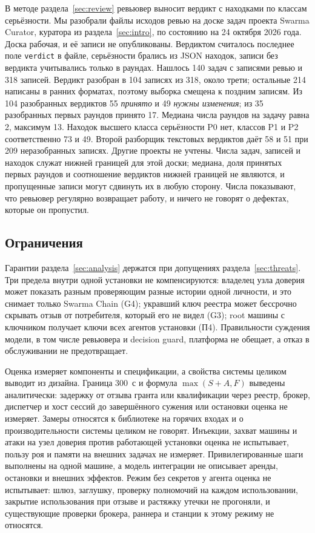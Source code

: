\documentclass[10pt,a4paper]{article}
\begin{document}
В методе раздела~\ref{sec:review} ревьювер выносит вердикт с находками по классам серьёзности. Мы разобрали файлы исходов ревью на доске задач проекта Swarma Curator, куратора из раздела~\ref{sec:intro}, по состоянию на 24 октября 2026 года. Доска рабочая, и её записи не опубликованы. Вердиктом считалось последнее поле \texttt{verdict} в файле, серьёзности брались из JSON находок, записи без вердикта учитывались только в раундах. Нашлось 140 задач с записями ревью и 318 записей. Вердикт разобран в 104 записях из 318, около трети; остальные 214 написаны в ранних форматах, поэтому выборка смещена к поздним записям. Из 104 разобранных вердиктов 55 \emph{принято} и 49 \emph{нужны изменения}; из 35 разобранных первых раундов принято 17. Медиана числа раундов на задачу равна 2, максимум 13. Находок высшего класса серьёзности P0 нет, классов P1 и P2 соответственно 73 и 49. Второй разборщик текстовых вердиктов даёт 58 и 51 при 209 неразобранных записях. Другие проекты не учтены. Числа задач, записей и находок служат нижней границей для этой доски; медиана, доля принятых первых раундов и соотношение вердиктов нижней границей не являются, и пропущенные записи могут сдвинуть их в любую сторону. Числа показывают, что ревьювер регулярно возвращает работу, и ничего не говорят о дефектах, которые он пропустил.

\subsection{Ограничения}

Гарантии раздела~\ref{sec:analysis} держатся при допущениях раздела~\ref{sec:threats}. Три предела внутри одной установки не компенсируются: владелец узла доверия может показать разным проверяющим разные истории одной личности, и это снимает только Swarma Chain (G4); укравший ключ реестра может бессрочно скрывать отзыв от потребителя, который его не видел (G3); root машины с ключником получает ключи всех агентов установки (П4). Правильности суждения модели, в том числе ревьювера и decision guard, платформа не обещает, а отказ в обслуживании не предотвращает.

Оценка измеряет компоненты и спецификации, а свойства системы целиком выводит из дизайна. Граница 300~с и формула $\max(S+A,F)$ выведены аналитически: задержку от отзыва гранта или квалификации через реестр, брокер, диспетчер и хост сессий до завершённого сужения или остановки оценка не измеряет. Замеры относятся к библиотеке на горячих входах и о производительности системы целиком не говорят. Инъекции, захват машины и атаки на узел доверия против работающей установки оценка не испытывает, пользу роя и памяти на внешних задачах не измеряет. Привилегированные шаги выполнены на одной машине, а модель интеграции не описывает аренды, остановки и внешних эффектов. Режим без секретов у агента оценка не испытывает: шлюз, заглушку, проверку полномочий на каждом использовании, закрытие использования при отзыве и растяжку утечки не прогоняли, и существующие проверки брокера, раннера и станции к этому режиму не относятся.
\end{document}
